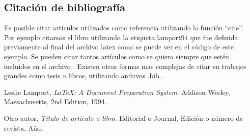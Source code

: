 \documentclass[a4paper,11pt]{article}
\begin{document}
\subsection{Citación de bibliografía}
%
Es posible citar artículos utilizados como referencia utilizando la función ``cite''. Por ejemplo citamos el libro \cite{lamport94} utilizando la etiqueta lamport94 que fue definida previamente al final del archivo latex como se puede ver en el código de este ejemplo. %
%
Se pueden citar tantos artículos como se quiera siempre que estén incluidos en el archivo \cite{otraetiqueta}. Existen otras formas mas complejas de citar en trabajos grandes como tesis o libros, utilizando archivos .bib . %
%


\begin{thebibliography}{15}

  Leslie Lamport,
  \emph{\LaTeX: A Document Preparation System}.
  Addison Wesley, Massachusetts,
  2nd Edition,
  1994.

  Otro autor,
  \emph{Título de artículo o libro}.
  Editorial o Journal,
  Edición o número de revista,
  Año.

\end{thebibliography}

\end{document}
